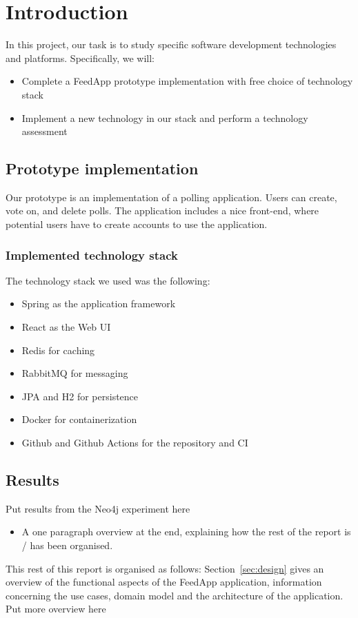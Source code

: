 
\section{Introduction}

\label{sec:introduction}

In this project, our task is to study specific software development technologies and platforms. Specifically, we will:

\begin{itemize}
    \item Complete a FeedApp prototype implementation with free choice of technology stack
    \item Implement a new technology in our stack and perform a technology assessment
\end{itemize}

\subsection{Prototype implementation}

Our prototype is an implementation of a polling application. Users can create, vote on, and delete polls. The application includes a nice front-end, where potential users have to create accounts to use the application. 

\subsubsection{Implemented technology stack}

The technology stack we used was the following: 

\begin{itemize}
    \item Spring as the application framework
    \item React as the Web UI
    \item Redis for caching
    \item RabbitMQ for messaging
    \item JPA and H2 for persistence 
    \item Docker for containerization
    \item Github and Github Actions for the repository and CI
\end{itemize}

\subsection{Results}

Put results from the Neo4j experiment here

\begin{itemize}

\item A one paragraph overview at the end, explaining how the rest of the report is / has been organised.

\end{itemize}

\noindent
This rest of this report is organised as follows:
Section~\ref{sec:design} gives an overview of the functional aspects of the FeedApp application, information concerning the use cases, domain model and the architecture of the application. 
Put more overview here
